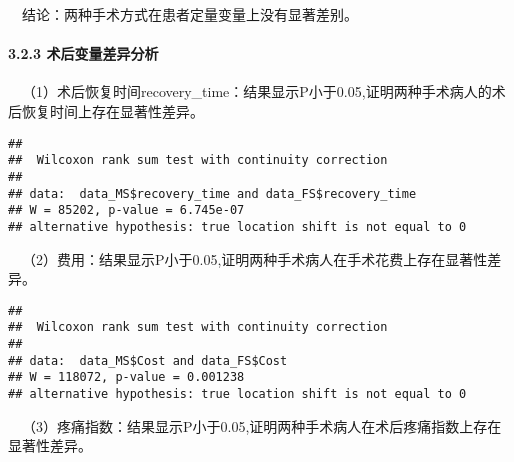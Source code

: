 \documentclass[
]{article}
\newenvironment{Shaded}{\begin{snugshade}}{\end{snugshade}}
\newcommand{\FunctionTok}[1]{\textcolor[rgb]{0.00,0.00,0.00}{#1}}
\newcommand{\NormalTok}[1]{#1}
\newcommand{\SpecialCharTok}[1]{\textcolor[rgb]{0.00,0.00,0.00}{#1}}
\begin{document}
 结论：两种手术方式在患者定量变量上没有显著差别。

\hypertarget{ux672fux540eux53d8ux91cfux5deeux5f02ux5206ux6790}{%
\paragraph{3.2.3
术后变量差异分析}\label{ux672fux540eux53d8ux91cfux5deeux5f02ux5206ux6790}}

 （1）术后恢复时间recovery\_time：结果显示P小于0.05,证明两种手术病人的术后恢复时间上存在显著性差异。

\begin{Shaded}
\end{Shaded}

\begin{verbatim}
## 
##  Wilcoxon rank sum test with continuity correction
## 
## data:  data_MS$recovery_time and data_FS$recovery_time
## W = 85202, p-value = 6.745e-07
## alternative hypothesis: true location shift is not equal to 0
\end{verbatim}

 （2）费用：结果显示P小于0.05,证明两种手术病人在手术花费上存在显著性差异。

\begin{Shaded}
\end{Shaded}

\begin{verbatim}
## 
##  Wilcoxon rank sum test with continuity correction
## 
## data:  data_MS$Cost and data_FS$Cost
## W = 118072, p-value = 0.001238
## alternative hypothesis: true location shift is not equal to 0
\end{verbatim}

 （3）疼痛指数：结果显示P小于0.05,证明两种手术病人在术后疼痛指数上存在显著性差异。

\begin{Shaded}
\end{Shaded}
\end{document}
